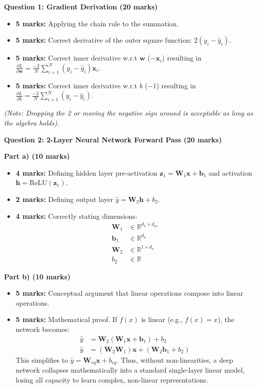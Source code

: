 \documentclass[11pt]{article}
\begin{document}
\textbf{Question 1: Gradient Derivation (20 marks)}
\begin{itemize}
    \item \textbf{5 marks:} Applying the chain rule to the summation.
    \item \textbf{5 marks:} Correct derivative of the outer square function: $2(y_i - \hat{y}_i)$.
    \item \textbf{5 marks:} Correct inner derivative w.r.t $\mathbf{w}$ ($-\mathbf{x}_i$) resulting in $\frac{\partial L}{\partial \mathbf{w}} = \frac{-2}{N} \sum_{i=1}^{N} (y_i - \hat{y}_i)\mathbf{x}_i$.
    \item \textbf{5 marks:} Correct inner derivative w.r.t $b$ ($-1$) resulting in $\frac{\partial L}{\partial b} = \frac{-2}{N} \sum_{i=1}^{N} (y_i - \hat{y}_i)$.
\end{itemize}
\textit{(Note: Dropping the 2 or moving the negative sign around is acceptable as long as the algebra holds).}

\vspace{0.5cm}

\textbf{Question 2: 2-Layer Neural Network Forward Pass (20 marks)}

\textbf{Part a) (10 marks)}
\begin{itemize}
    \item \textbf{4 marks:} Defining hidden layer pre-activation $\mathbf{z}_1 = \mathbf{W}_1 \mathbf{x} + \mathbf{b}_1$ and activation $\mathbf{h} = \text{ReLU}(\mathbf{z}_1)$.
    \item \textbf{2 marks:} Defining output layer $\hat{y} = \mathbf{W}_2 \mathbf{h} + b_2$.
    \item \textbf{4 marks:} Correctly stating dimensions: 
    \begin{align*}
        \mathbf{W}_1 &\in \mathbb{R}^{d_h \times d_{in}} \\
        \mathbf{b}_1 &\in \mathbb{R}^{d_h} \\
        \mathbf{W}_2 &\in \mathbb{R}^{1 \times d_h} \\
        b_2 &\in \mathbb{R}
    \end{align*}
\end{itemize}

\textbf{Part b) (10 marks)}
\begin{itemize}
    \item \textbf{5 marks:} Conceptual argument that linear operations compose into linear operations.
    \item \textbf{5 marks:} Mathematical proof. If $f(x)$ is linear (e.g., $f(x) = x$), the network becomes:
    \begin{align*}
    \hat{y} &= \mathbf{W}_2 (\mathbf{W}_1 \mathbf{x} + \mathbf{b}_1) + b_2 \\
    \hat{y} &= (\mathbf{W}_2 \mathbf{W}_1) \mathbf{x} + (\mathbf{W}_2 \mathbf{b}_1 + b_2)
    \end{align*}
    This simplifies to $\hat{y} = \mathbf{W}_{eq} \mathbf{x} + b_{eq}$. Thus, without non-linearities, a deep network collapses mathematically into a standard single-layer linear model, losing all capacity to learn complex, non-linear representations.
\end{itemize}
\end{document}
